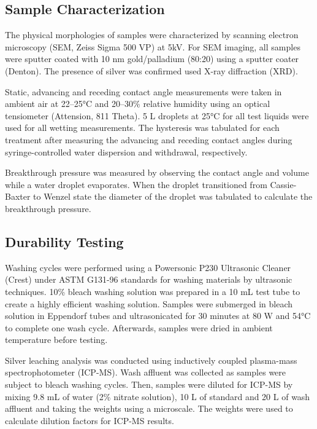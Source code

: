 \documentclass[journal=jacsat,manuscript=article]{achemso}
\begin{document}
\subsection{Sample Characterization}
The physical morphologies of samples were characterized by scanning electron microscopy (SEM, Zeiss Sigma 500 VP) at 5kV. For SEM imaging, all samples were sputter coated with 10 nm gold/palladium (80:20) using a sputter coater (Denton). The presence of silver was confirmed used X-ray diffraction (XRD). %

Static, advancing and receding contact angle measurements were taken in ambient air at 22–25°C and 20–30\% relative humidity using an optical tensiometer (Attension, 811 Theta). 5 \micro L droplets at 25°C for all test liquids were used for all wetting measurements. The hysteresis was tabulated for each treatment after measuring the advancing and receding contact angles during syringe-controlled water dispersion and withdrawal, respectively.

Breakthrough pressure was measured by observing the contact angle and volume while a water droplet evaporates. When the droplet transitioned from Cassie-Baxter to Wenzel state the diameter of the droplet was tabulated to calculate the breakthrough pressure.



\subsection{Durability Testing}


Washing cycles were performed using a Powersonic P230 Ultrasonic Cleaner (Crest) under ASTM G131-96 standards for washing materials by ultrasonic techniques. 10\% bleach washing solution was prepared in a 10 mL test tube to create a highly efficient washing solution. Samples were submerged in bleach solution in Eppendorf tubes and ultrasonicated for 30 minutes at 80 W and 54°C to complete one wash cycle. Afterwards, samples were dried in ambient temperature before testing.

Silver leaching analysis was conducted using inductively coupled plasma-mass spectrophotometer (ICP-MS). Wash affluent was collected as samples were subject to bleach washing cycles. Then, samples were diluted for ICP-MS by mixing 9.8 mL of water (2\% nitrate solution), 10 \micro L of standard and 20 \micro L of wash affluent and taking the weights using a microscale. The weights were used to calculate dilution factors for ICP-MS results. 
\end{document}
